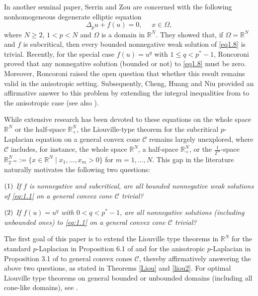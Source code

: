 \documentclass[12pt]{amsart}
\theoremstyle{definition}
\theoremstyle{remark}
\theoremstyle{conclusion}
\theoremstyle{conjecture}
\numberwithin{equation}{section}
\begin{document}
In another seminal paper, Serrin and Zou \cite{SZ} are concerned with the following nonhomogeneous degenerate elliptic equation
\begin{equation}\label{eq1.8}
 \Delta_p u+f(u)=0,\quad\,\,x\in\Omega,
\end{equation}
where $N\geq2$, $1<p<N$ and $\Omega$ is a domain in $\mathbb{R}^N$. They showed that, if $\Omega=\mathbb{R}^N$ and $f$ is subcritical, then every bounded nonnegative weak solution of \eqref{eq1.8} is trivial. Recently, for the special case $f(u)=u^q$ with $1\leq q<p^*-1$, Roncoroni \cite{R} proved that any nonnegative solution (bounded or not) to \eqref{eq1.8} must be zero. Moreover, Roncoroni raised the open question that whether this result remains valid in the anisotropic setting. Subsequently, Cheng, Huang and Niu \cite{CHN} provided an affirmative answer to this problem by extending the integral inequalities from \cite{SZ} to the anisotropic case (see also \cite{LWY}).

While extensive research has been devoted to these equations on the whole space $\mathbb{R}^N$ or the half-space $\mathbb{R}^N_+$, the Liouville-type theorem for the subcritical $p$-Laplacian equation on a general convex cone $\mathcal{C}$ remains largely unexplored, where $\mathcal{C}$ includes, for instance, the whole space $\mathbb{R}^N$, a half-space $\mathbb{R}^N_+$, or the $\frac{1}{2^m}$-space $\mathbb{R}^N_{2^{-m}}:= \{x\in\mathbb{R}^N \mid x_1,\dots,x_m>0\}$ for $m=1,\dots,N$. This gap in the literature naturally motivates the following two questions:

\smallskip

\textit{$(\rm{1})$ If $f$ is nonnegative and subcritical, are all bounded nonnegative weak solutions of \eqref{eq:1.1} on a general convex cone $\mathcal{C}$ trivial?}


\textit{$(\rm{2})$ If $f(u)=u^q$ with $0< q<p^*-1$, are all nonnegative solutions (including unbounded ones) to \eqref{eq:1.1} on a general convex cone $\mathcal{C}$ trivial? }


\smallskip
The first goal of this paper is to extend the Liouville type theorems in $\mathbb{R}^{N}$ for the standard $p$-Laplacian in Proposition 6.1 of \cite{SZ} and for the anisotropic $p$-Laplacian in Proposition 3.1 of \cite{CHN} to general convex cones $\mathcal{C}$, thereby affirmatively answering the above two questions, as stated in Theorems \ref{Liou} and \ref{liou2}. For optimal Liouville type theorems on general bounded or unbounded domains (including all cone-like domains), see \cite{DQ0,DQ}.
\end{document}
